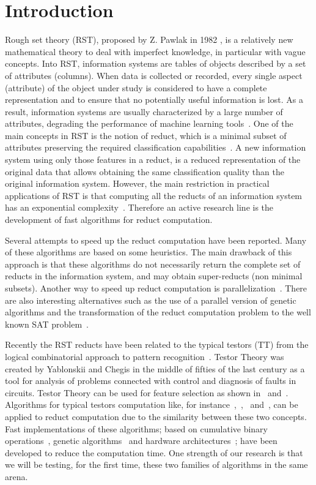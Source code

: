 \documentclass[authoryear,11pt]{elsarticle}
\begin{document}
\section{Introduction}
  Rough set theory (RST), proposed by Z. Pawlak in 1982 \citep{Pawlak81,Pawlak81-2,Pawlak82,Pawlak91}, 
  is a relatively new mathematical theory 
  to deal with imperfect knowledge, in particular with vague concepts. Into RST, information systems
  are tables of objects described by a set of attributes (columns). 
  When data is collected or recorded, every single aspect (attribute) of the object under study is considered 
  to have a complete representation and to ensure that no potentially useful information is lost.
  As a result, information systems are usually characterized by a large number of attributes,
  degrading the performance of machine learning tools~\citep{Parthalain08}.
  One of the main concepts in RST is the notion of reduct, which is a minimal subset of attributes 
  preserving the required classification capabilities~\citep{Pawlak91}. A new information system using 
  only those features in a reduct, is a reduced representation of the original data that allows obtaining  
  the same classification quality than the original information system. 
  However, the main restriction in practical applications of RST is that computing all the reducts of an information 
  system has an exponential complexity~\citep{Skowron92}. Therefore an active research line is the development 
  of fast algorithms for reduct computation.
  
  Several attempts to speed up the reduct computation have been reported. Many of these algorithms are 
  based on some heuristics. The main drawback of this approach is that these algorithms do not necessarily 
  return the complete set of reducts in the information system, and may obtain super-reducts (non minimal subsets). 
  Another way to speed up reduct computation is parallelization~\citep{Strakowski08}. There are also 
  interesting alternatives such as the use of a parallel version of genetic algorithms \citep{Wroblewski98}
  and the transformation of the reduct computation problem to the well known SAT problem~\citep{Jensen14}.
  
  Recently the RST reducts have been related to the typical testors (TT) from the logical combinatorial approach to 
  pattern recognition~\citep{Lazo15}. Testor Theory was created by Yablonskii and Chegis in the middle of fifties 
  of the last century as a tool for analysis of problems connected with control and diagnosis of faults in circuits. 
  Testor Theory can be used for feature selection as shown in~\citep{Ruiz08} and~\citep{Martinez01}. Algorithms for
  typical testors computation like, for instance~\citep{Ruiz85},~\citep{Santiesteban03},~\citep{Sanchez07} 
  and~\citep{Lias09}, can be applied to reduct computation due to the similarity between these two concepts. 
  Fast implementations of these algorithms; based on cumulative binary operations~\citep{Sanchez10}, genetic 
  algorithms~\citep{Sanchez99} and hardware architectures~\citep{Rojas12}; have been developed to reduce the computation 
  time. One strength of our research is that we will be testing, for the first time, these two families of algorithms 
  in the same arena.
     
\end{document}
